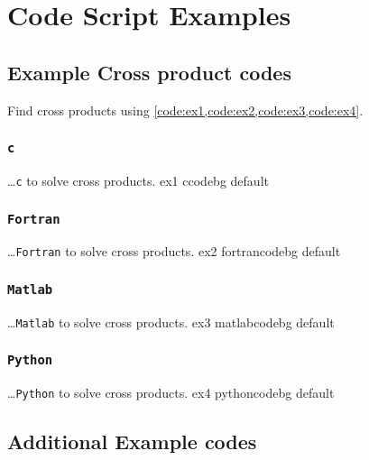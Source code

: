 \documentclass[../Dissertation]{subfiles}
\begin{document}
\chapter{Code Script Examples}\label{AppendixA}
    
    \vspace{-0.5\UofUDoubleSpace}
    
\section{Example Cross product codes}
    Find cross products using
    \cref{code:ex1,code:ex2,code:ex3,code:ex4}.  
    
\subsection{\texttt{c}}
    {}
    {\ldots \texttt{c} to solve cross products.}
    {ex1}
    {\footnotesize}
    {ccodebg}
    {default}

\subsection{\texttt{Fortran}}
    {}
    {\ldots \texttt{Fortran} to solve cross products.}
    {ex2}
    {\footnotesize}
    {fortrancodebg}
    {default}

\subsection{\texttt{Matlab}}
    {}
    {\ldots \texttt{Matlab} to solve cross products.}
    {ex3}
    {\footnotesize}
    {matlabcodebg}
    {default}

\subsection{\texttt{Python}}
    {}
    {\ldots \texttt{Python} to solve cross products.}
    {ex4}
    {\footnotesize}
    {pythoncodebg}
    {default}

\section{Additional Example codes}
\end{document}
